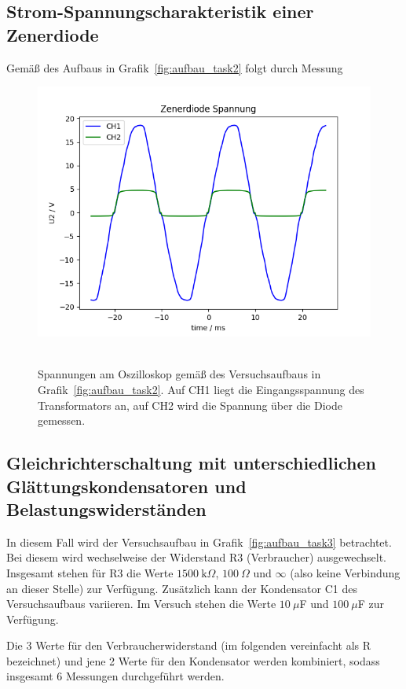 \documentclass{article}
\begin{document}
\subsection{Strom-Spannungscharakteristik einer Zenerdiode}

Gemäß des Aufbaus in Grafik~\ref{fig:aufbau_task2} folgt durch Messung


\begin{figure}[H]
\caption{Spannungen am Oszilloskop gemäß des Versuchsaufbaus in Grafik~\ref{fig:aufbau_task2}. Auf CH1 liegt die Eingangsspannung des Transformators an, auf CH2 wird die Spannung über die Diode gemessen.}
\label{fig:grafik_task2}
{\centering
\includegraphics[scale=0.7]{bilder/task2.png}
~
}
\end{figure}

\subsection{Gleichrichterschaltung mit unterschiedlichen Glättungskondensatoren und Belastungswiderständen}

In diesem Fall wird der Versuchsaufbau in Grafik~\ref{fig:aufbau_task3} betrachtet. Bei diesem wird wechselweise der Widerstand R3 (Verbraucher) ausgewechselt. Insgesamt stehen für R3 die Werte $1500~\text{k}\Omega$, $100~\Omega$ und $\infty$ (also keine Verbindung an dieser Stelle) zur Verfügung. Zusätzlich kann der Kondensator C1 des Versuchsaufbaus variieren. Im Versuch stehen die Werte $10~\mu$F und $100~\mu$F zur Verfügung.

Die 3 Werte für den Verbraucherwiderstand (im folgenden vereinfacht als R bezeichnet) und jene 2 Werte für den Kondensator werden kombiniert, sodass insgesamt 6 Messungen durchgeführt werden.
\end{document}

